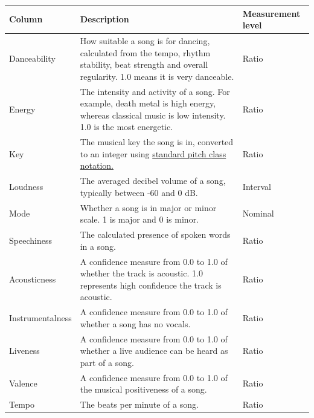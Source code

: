 \documentclass[12pt]{report}
\begin{document}
\begin{table}[H]
    \centering
    \begin{tabular}{ |p{}| p{}| p{}|}
        \hline
        \cellcolor{blue!25}Column & \cellcolor{blue!25}Description & \cellcolor{blue!25}Measurement level\\
            \hline
            Danceability & How suitable a song is for dancing, calculated from the tempo, rhythm stability, beat strength and overall regularity. 1.0 means it is very danceable.
            & Ratio \\
            \hline
            Energy & The intensity and activity of a song. For example, death metal is high energy, whereas classical music is low intensity. 1.0 is the most energetic.
            & Ratio\\
            \hline
            Key & The musical key the song is in, converted to an integer using \href{https://smbutterfield.github.io/ibmt17-18/22-intro-to-non-diatonic-materials/b2-tx-pcintnotation.html}{standard pitch class notation.}\autocite{butterfield_22b_nodate} 
            & Ratio\\
            \hline
            Loudness & The averaged decibel volume of a song, typically between -60 and 0 dB.
            & Interval\\
            \hline
            Mode & Whether a song is in major or minor scale. 1 is major and 0 is minor.
            & Nominal\\
            \hline
            Speechiness & The calculated presence of spoken words in a song.
            & Ratio\\
            \hline
            Acousticness & A confidence measure from 0.0 to 1.0 of whether the track is acoustic. 1.0 represents high confidence the track is acoustic.
            & Ratio\\
            \hline
            Instrumentalness & A confidence measure from 0.0 to 1.0 of whether a song has no vocals.
            & Ratio\\
            \hline
            Liveness & A confidence measure from 0.0 to 1.0 of whether a live audience can be heard as part of a song.
            & Ratio\\
            \hline
            Valence & A confidence measure from 0.0 to 1.0 of the musical positiveness of a song.
            & Ratio\\
            \hline
            Tempo & The beats per minute of a song.
            & Ratio\\

\end{tabular}
\end{table}
\end{document}
